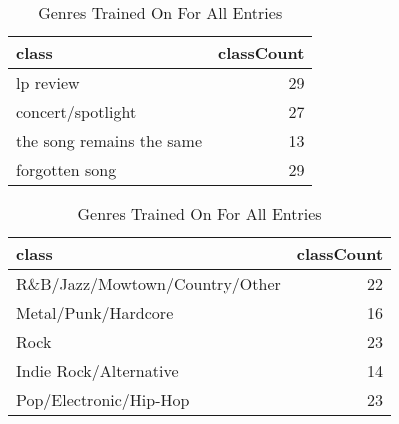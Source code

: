 \documentclass[letterpaper,10pt]{article}
\begin{document}
 \begin{table}[H]
\centering
\setlength\tabcolsep{4pt}
\begin{minipage}{0.48\textwidth}
\centering
\begin{tabular}{lr}
\hline
 class                     &   classCount \\
\hline
 lp review                 &           29 \\
 concert/spotlight         &           27 \\
 the song remains the same &           13 \\
 forgotten song            &           29 \\
\hline
\end{tabular}
\caption{Blog Structure Trained On For All Entries}
\label{tab:falls} 
\end{minipage}%
\hfill
\begin{minipage}{0.48\textwidth}
\centering
\begin{tabular}{lr}
\hline
 class                          &   classCount \\
\hline
 R\&B/Jazz/Mowtown/Country/Other &           22 \\
 Metal/Punk/Hardcore            &           16 \\
 Rock                           &           23 \\
 Indie Rock/Alternative         &           14 \\
 Pop/Electronic/Hip-Hop         &           23 \\
\hline
\end{tabular}
 \caption{Genres Trained On For All Entries} 
 \label{tab:fallg} 
\end{minipage}
\end{table}
\end{document}
